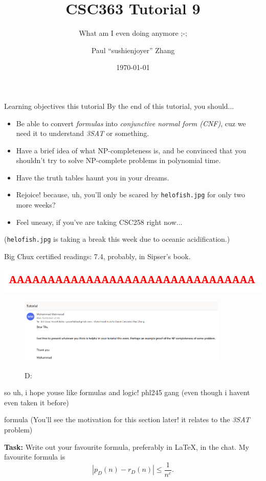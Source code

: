 \documentclass{beamer}
\title{CSC363 Tutorial 9}
\subtitle{What am I even doing anymore ;-;}
\date{\today}
\author{Paul ``sushi{\textunderscore}enjoyer'' Zhang}
\institute{University of Chux}
\begin{document}
\maketitle

\begin{frame}{Learning objectives this tutorial}
By the end of this tutorial, you should...
\begin{itemize}
\item Be able to convert \textit{formulas} into \textit{conjunctive normal form (CNF)}, cuz we need it to understand \textit{3SAT} or something.
\item Have a brief idea of what NP-completeness is, and be convinced that you shouldn't try to solve NP-complete problems in polynomial time.
\item Have the truth tables haunt you in your dreams.
\item Rejoice! because, uh, you'll only be scared by \texttt{helo\textunderscore fish.jpg} for only two more weeks? 
\item Feel uneasy, if you've are taking CSC258 right now... 
\end{itemize}
(\texttt{helo\textunderscore fish.jpg} is taking a break this week due to oceanic acidification.) 

Big Chux certified readings: 7.4, probably, in Sipser's book.
\end{frame}

\begin{frame}{\includegraphics{img/a.png}}
\begin{figure}[h]
\centering
\includegraphics[width=10cm]{img/helpme.png}

D:
\end{figure}

so uh, i hope youse like formulas and logic! phl245 gang \emojisunglasses (even though i havent even taken it before)
\end{frame}

\begin{frame}{formula}
(You'll see the motivation for this section later! it relates to the \textit{3SAT} problem)

\vspace{2mm}

\textbf{Task:} Write out your favourite formula, preferably in \LaTeX, in the chat. My favourite formula is
$$|p_D(n) - r_D(n)| \leq \frac{1}{n^c}.$$
\end{frame}
\end{document}

